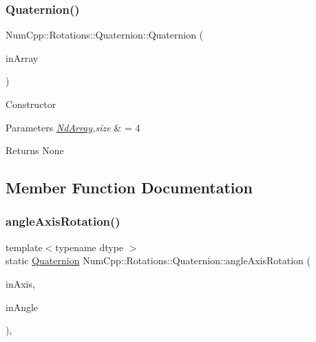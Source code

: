 \subsubsection{\texorpdfstring{Quaternion()}{Quaternion()}\hspace{0.1cm}{\footnotesize\ttfamily [3/3]}}
{\footnotesize\ttfamily Num\+Cpp\+::\+Rotations\+::\+Quaternion\+::\+Quaternion (\begin{DoxyParamCaption}\item[{const \mbox{\hyperlink{class_num_cpp_1_1_nd_array}{Nd\+Array}}$<$ double $>$ \&}]{in\+Array }\end{DoxyParamCaption})\hspace{0.3cm}{\ttfamily [inline]}}

Constructor


\begin{DoxyParams}{Parameters}
{\em \mbox{\hyperlink{class_num_cpp_1_1_nd_array}{Nd\+Array}},size} & = 4 \\
\hline
\end{DoxyParams}
\begin{DoxyReturn}{Returns}
None 
\end{DoxyReturn}


\subsection{Member Function Documentation}
\mbox{\label{class_num_cpp_1_1_rotations_1_1_quaternion_a6da99fa20889740318ea7f1937804089}} 
\subsubsection{\texorpdfstring{angle\+Axis\+Rotation()}{angleAxisRotation()}}
{\footnotesize\ttfamily template$<$typename dtype $>$ \\
static \mbox{\hyperlink{class_num_cpp_1_1_rotations_1_1_quaternion}{Quaternion}} Num\+Cpp\+::\+Rotations\+::\+Quaternion\+::angle\+Axis\+Rotation (\begin{DoxyParamCaption}\item[{const \mbox{\hyperlink{class_num_cpp_1_1_nd_array}{Nd\+Array}}$<$ dtype $>$ \&}]{in\+Axis,  }\item[{double}]{in\+Angle }\end{DoxyParamCaption})\hspace{0.3cm}{\ttfamily [inline]}, {\ttfamily [static]}}


